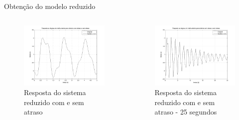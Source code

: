 \documentclass[10pt]{beamer}
\begin{document}
\begin{frame}[fragile]{Obtenção do modelo reduzido}
\begin{columns}[T]
\begin{column}{.5\textwidth}
\begin{figure}[!ht]
\centering
\includegraphics[width=1\textwidth]{figures/resultados/modelo/respostaMalhaAberta}
\caption{Resposta do sistema reduzido com e sem atraso}
\label{openLoopResp1}
\end{figure}
\end{column}

\begin{column}{.5\textwidth}
\begin{figure}[!ht]
\centering
\includegraphics[width=1\textwidth]{figures/resultados/modelo/respostaMalhaAberta25s}
\caption{Resposta do sistema reduzido com e sem atraso - 25 segundos}
\label{openLoopResp2}
\end{figure}
\end{column}


\end{columns}
\end{frame}
\end{document}
